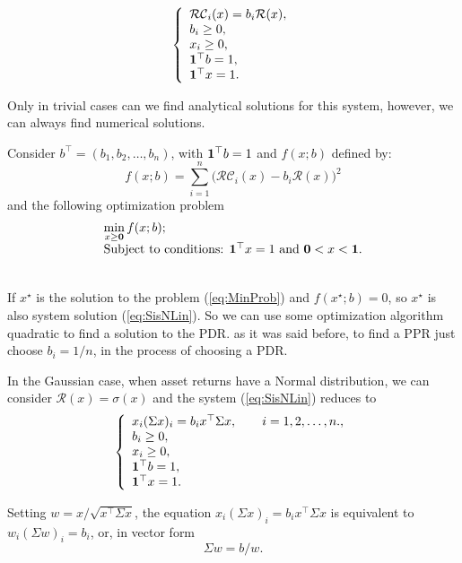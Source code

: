 \begin{equation}\label{eq:SisNLin}
\left\{
\begin{array}{l}
\mathcal{RC}_i(x)=b_i\mathcal{R}(x), \\
b_i \geq 0, \\
x_i \geq 0, \\
{\bf 1}^\top b =1, \\
{\bf 1}^\top x =1.
\end{array}
\right.
\end{equation}

Only in trivial cases can we find analytical solutions for this system, however, we can always find numerical solutions.

Consider $b^\top = (b_1, b_2, \dots, b_n)$, with ${\bf 1}^\top b =1$ and $f(x;b)$ defined by:
\[
f(x;b) = \sum_{i=1}^n \big(\mathcal{RC}_i(x) -b_i\mathcal{R}(x)\Big)^2
\] and the following optimization problem
\begin{equation}\label{eq:MinProb}
\begin{array}{l}
\displaystyle\min_{x\geq \textbf{0}} f(x;b); \\
\vspace{0.5cm}
\mbox{Subject to conditions: } {\bf 1}^\top x =1 \mbox{ and } {\bf 0}<x<{\bf 1}.
\end{array}
\end{equation}

If $x^\star$ is the solution to the problem (\ref{eq:MinProb}) and
$f(x^\star;b)=0$, so $x^\star$ is also system solution
(\ref{eq:SisNLin}). So we can use some optimization algorithm
quadratic to find a solution to the PDR. as it was
said before, to find a PPR just choose $b_i=1/n$, in the
process of choosing a PDR.

In the Gaussian case, when asset returns have a Normal distribution, we can consider $\mathcal{R}(x)=\sigma(x)$ and the system (\ref{eq:SisNLin}) reduces to
\begin{equation}\label{eq:SisGauss}
\left\{
\begin{array}{l}
x_i (\Sigma x )_i = b_i x^\top \Sigma x, \qquad i=1,2,\dots,n., \\
b_i \geq 0, \\
x_i \geq 0, \\
{\bf 1}^\top b =1, \\
{\bf 1}^\top x =1.
\end{array}
\right.
\end{equation}

Setting $w=x/\sqrt{x^\top \Sigma x}$, the equation $x_i (\Sigma x )_i = b_i x^\top \Sigma x$ is equivalent to $w_i(\Sigma w)_i =b_i$, or, in vector form
\[
\Sigma w = b/w.
\]

